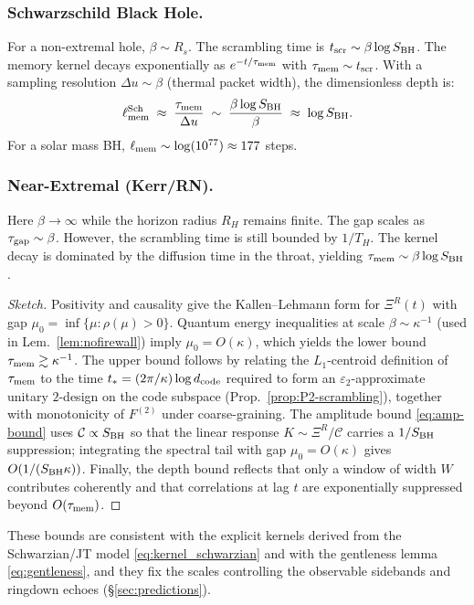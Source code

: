 \documentclass[11pt,a4paper]{article}
\theoremstyle{plain}
\theoremstyle{definition}
\theoremstyle{remark}
\begin{document}
\subsubsection{Schwarzschild Black Hole.}
For a non-extremal hole, $\beta \sim R_s$. The scrambling time is $t_{\rm scr} \sim \beta \log S_{\rm BH}$.
The memory kernel decays exponentially as $e^{-t/\tau_{\rm mem}}$ with $\tau_{\rm mem} \sim t_{\rm scr}$.
With a sampling resolution $\Delta u \sim \beta$ (thermal packet width), the dimensionless depth is:
\[
\ell_{\rm mem}^{\text{Sch}} \;\approx\; \frac{\tau_{\rm mem}}{\Delta u} \;\sim\; \frac{\beta \log S_{\rm BH}}{\beta} \;\approx\; \log S_{\rm BH}.
\]
For a solar mass BH, $\ell_{\rm mem} \sim \log(10^{77}) \approx 177$ steps.

\subsubsection{Near-Extremal (Kerr/RN).}
Here $\beta \to \infty$ while the horizon radius $R_H$ remains finite. The gap scales as $\tau_{\rm gap} \sim \beta$.
However, the scrambling time is still bounded by $1/T_H$.
The kernel decay is dominated by the diffusion time in the throat, yielding $\tau_{\rm mem} \sim \beta \log S_{\rm BH}$.

\begin{proof}[Sketch]
Positivity and causality give the Kallen--Lehmann form for $\Xi^R(t)$ with gap $\mu_0=\inf\{\mu:\rho(\mu)\!>\!0\}$. Quantum energy
inequalities at scale $\beta\sim\kappa^{-1}$ (used in Lem.~\ref{lem:nofirewall}) imply $\mu_0=O(\kappa)$, which yields the lower bound
$\tau_{\rm mem}\gtrsim \kappa^{-1}$. The upper bound follows by relating the $L_1$-centroid definition of $\tau_{\rm mem}$ to the time
$t_\ast=(2\pi/\kappa)\log d_{\rm code}$ required to form an $\varepsilon_2$-approximate unitary $2$-design on the code subspace (Prop.~\ref{prop:P2-scrambling}), together with monotonicity of $F^{(2)}$ under coarse-graining. The amplitude bound \eqref{eq:amp-bound} uses
$\mathcal{C}\propto S_{\rm BH}$ so that the linear response $K\!\sim\!\Xi^R/\mathcal{C}$ carries a $1/S_{\rm BH}$ suppression; integrating
the spectral tail with gap $\mu_0=O(\kappa)$ gives $O(1/(S_{\rm BH}\kappa))$. Finally, the depth bound reflects that only a window of width
$W$ contributes coherently and that correlations at lag $t$ are exponentially suppressed beyond $O(\tau_{\rm mem})$.
\end{proof}

These bounds are consistent with the explicit kernels derived from the Schwarzian/JT model \eqref{eq:kernel_schwarzian} and with the
gentleness lemma \eqref{eq:gentleness}, and they fix the scales controlling the observable sidebands and ringdown echoes
(\S\ref{sec:predictions}).
\end{document}
